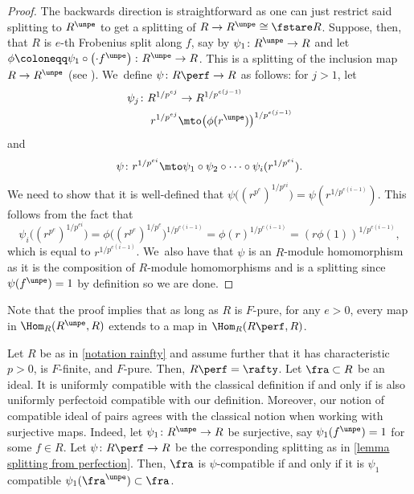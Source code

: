 \begin{proof}
The backwards direction is straightforward as one can just restrict said splitting to $R^\unpe$ to get a splitting of $R\to R^\unpe\cong \fstare R$. Suppose, then, that $R$ is $e$-th Frobenius split along $f$, say by $\psi_1\colon R^\unpe\to R$ and let $\phi\coloneqq\psi_1\circ \left(\cdot f^\unpe\right)\colon R^\unpe\to R$. This is a splitting of the inclusion map $R\to R^\unpe$ (see \eg \cite[Prop.\,1.4.6]{SchwedeSmithFSingularitiesBook}). We~define $\psi\colon R\perf\to R$ as follows: for $j>1$, let
\begin{align*}
\psi_j \colon R^{1/p^{ej}} &\to R^{1/p^{e(j-1)}} \\
r^{1/p^{ej}} &\mto \bigl(\phi(r^\unpe)\bigr)^{1/p^{e(j-1)}}
\end{align*}
and
\[\psi \colon r^{1/p^{ei}} \mto \psi_1\circ \psi_2\circ\cdots\circ \psi_i(r^{1/p^{ei}}).
\]
We need to show that it is well-defined \ie that $\psi\bigl((r^{p^e})^{1/p^{ei}}\bigr)=\psi(r^{1/p^{e(i-1)}})$. This follows from the fact that
\[
\psi_i\bigl((r^{p^e})^{1/p^{ei}}\bigr)=\phi\bigl((r^{p^e})^{1/p^{e}}\bigr)^{1/p^{e(i-1)}}=\phi(r)^{1/p^{e(i-1)}}=(r\phi(1))^{1/p^{e(i-1)}},
\]
which is equal to $r^{1/p^{e(i-1)}}$. We~also have that $\psi$ is an $R$\nobreakdash-module homomorphism as it is the composition of $R$\nobreakdash-module homomorphisms and is a splitting since $\psi(f^\unpe)=1$ by definition so we are done.
\end{proof}
\begin{remark}
Note that the proof implies that as long as $R$ is $F$-pure, for any $e>0$, every map in $\Hom_R(R^\unpe,R)$ extends to a map in $\Hom_R(R\perf,R)$.
\end{remark}

\begin{corollary}\label{corollary equiv comp with char p}
Let $R$ be as in \autoref{notation rainfty} and assume further that it has characteristic $p>0$, is $F$-finite, and $F$-pure. Then, $R\perf=\rafty$. Let $\fra\subset R$ be an ideal. It is uniformly compatible with the classical definition if and only if is also uniformly perfectoid compatible with our definition. Moreover, our notion of compatible ideal of pairs agrees with the classical notion when working with surjective maps. Indeed,
let $\psi_1\colon R^\unpe\to R$ be surjective, say $\psi_1(f^\unpe)=1$ for some $f\in R$. Let $\psi\colon R\perf\to R$ be the corresponding splitting as in \autoref{lemma splitting from perfection}. Then, $\fra$ is $\psi$-compatible if and only if it is $\psi_1$ compatible \ie $\psi_1(\fra^\unpe)\subset \fra$.
\end{corollary}

